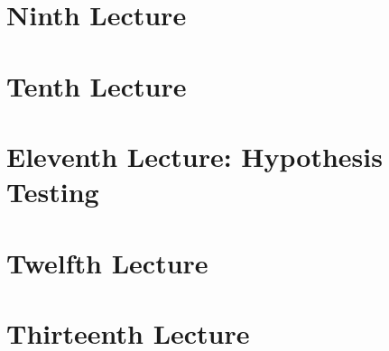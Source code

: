 \documentclass{article}
\begin{document}
\section{Ninth Lecture}

\newpage

\section{Tenth Lecture}

\newpage

\section{Eleventh Lecture: Hypothesis Testing}

\newpage

\section{Twelfth Lecture}

\newpage

\section{Thirteenth Lecture}

\newpage
\end{document}
